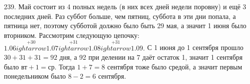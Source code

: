 239. Май состоит из 4 полных недель (в них всех дней недели поровну) и ещё 3 последних дней. Раз суббот больше, чем пятниц, суббота в эти дни попала, а пятница нет, поэтому субботой должно было быть 29 мая, а значит 1 июня было вторником. Рассмотрим следующую цепочку:
$1.06\stackrel{+30}{
ightarrow}1.07\stackrel{+31}{
ightarrow}1.08\stackrel{+31}{
ightarrow}1.09.$ С 1 июня до 1 сентября прошло $30+31+31=92$ дня, а 92 при делении на 7 даёт остаток 1, значит 1 сентября было $\text{вт}+1=\text{ср}.$ Тогда $1+7=8$ сентября тоже было средой, а значит первым понедельником было $8-2=6$ сентября.\\
